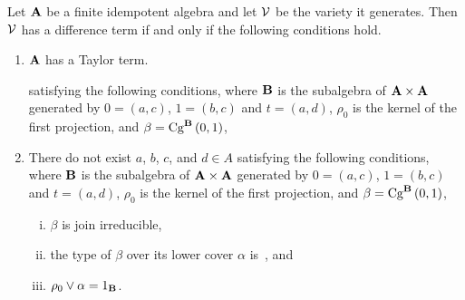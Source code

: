 \begin{theorem}
Let $\alg A$ be a finite idempotent algebra and let $\sV$ be the variety 
it generates. Then $\sV$ has a difference term if and only if the
following conditions hold.
\begin{enumerate}
\item $\alg A$ has a Taylor term.





satisfying
the following conditions, where 
$\alg B$ is the subalgebra of 
$\alg A \times \alg A$ generated by $0 = (a, c)$, $1 = (b,c)$ 
and $t = (a,d)$, $\rho_0$ is the kernel of the first projection,
and $\beta = \Cga01{B}$,



\item There do not exist $a$, $b$, $c$, and $d\in A$ satisfying
the following conditions, where 
$\alg B$ is the subalgebra of 
$\alg A \times \alg A$ generated by $0 = (a, c)$, $1 = (b,c)$ 
and $t = (a,d)$, $\rho_0$ is the kernel of the first projection,
and $\beta = \Cga01{B}$,
\begin{enumerate}[(i)]
\item $\beta$ is join irreducible,
\item the type of $\beta$ over its lower cover $\alpha$ is~\atyp, and
\item 
$\rho_0 \join \alpha = 1_{\alg B}$.
\end{enumerate}
\end{enumerate}
\end{theorem}

